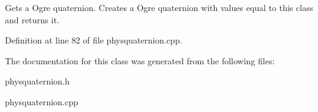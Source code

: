 Gets a Ogre quaternion. Creates a Ogre quaternion with values equal to this class and returns it. 

Definition at line 82 of file physquaternion.cpp.

The documentation for this class was generated from the following files:\begin{DoxyCompactItemize}
\item 
physquaternion.h\item 
physquaternion.cpp\end{DoxyCompactItemize}
